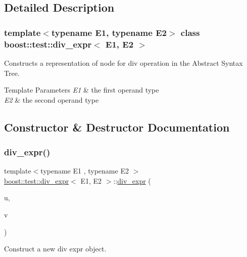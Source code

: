 \subsection{Detailed Description}
\subsubsection*{template$<$typename E1, typename E2$>$\newline
class boost\+::test\+::div\+\_\+expr$<$ E1, E2 $>$}

Constructs a representation of node for div operation in the Abstract Syntax Tree. 


\begin{DoxyTemplParams}{Template Parameters}
{\em E1} & the first operand type \\
\hline
{\em E2} & the second operand type \\
\hline
\end{DoxyTemplParams}


\subsection{Constructor \& Destructor Documentation}
\mbox{\label{classboost_1_1test_1_1div__expr_ace035a15cb161fddbee21afb89991670}} 
\subsubsection{\texorpdfstring{div\_expr()}{div\_expr()}}
{\footnotesize\ttfamily template$<$typename E1 , typename E2 $>$ \\
\mbox{\hyperlink{classboost_1_1test_1_1div__expr}{boost\+::test\+::div\+\_\+expr}}$<$ E1, E2 $>$\+::\mbox{\hyperlink{classboost_1_1test_1_1div__expr}{div\+\_\+expr}} (\begin{DoxyParamCaption}\item[{E1 const \&}]{u,  }\item[{E2 const \&}]{v }\end{DoxyParamCaption})\hspace{0.3cm}{\ttfamily [inline]}}



Construct a new div expr object. 


